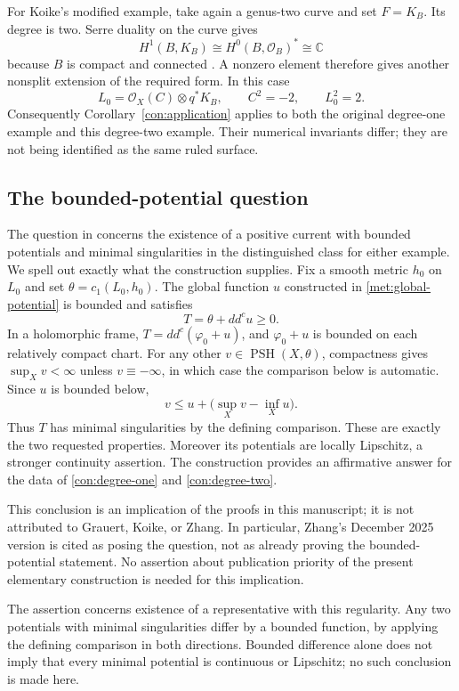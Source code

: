 \documentclass[11pt,a4paper]{article}
\numberwithin{equation}{section}
\theoremstyle{definition}
\theoremstyle{remark}
\newcommand{\C}{\mathbb C}
\newcommand{\OO}{\mathcal O}
\newcommand{\ddc}{dd^{c}}
\newcommand{\cOne}{c_1}
\DeclareMathOperator{\PSH}{PSH}
\begin{document}
For Koike's modified example, take again a genus-two curve and set
$F=K_B$. Its degree is two. Serre duality on the curve gives
\[
 H^1(B,K_B)\cong H^0(B,\OO_B)^*\cong\C
\]
because $B$ is compact and connected
\cite[Chapter III, \S7]{Hartshorne1977}. A nonzero element therefore
gives another nonsplit extension of the required form. In this case
\begin{equation}\label{con:degree-two}
 L_0=\OO_X(C)\otimes q^*K_B,\qquad C^2=-2,\qquad L_0^2=2.
\end{equation}
Consequently Corollary~\ref{con:application} applies to both the original
degree-one example and this degree-two example. Their numerical
invariants differ; they are not being identified as the same ruled
surface.

\subsection{The bounded-potential question}

The question in \cite[\S4]{Zhang2025} concerns the existence of a
positive current with bounded potentials and minimal singularities
in the distinguished class for either example. We spell out exactly
what the construction supplies. Fix a smooth metric $h_0$ on $L_0$
and set $\theta=\cOne(L_0,h_0)$. The global function $u$ constructed
in \eqref{met:global-potential} is bounded and satisfies
\[
                      T=\theta+\ddc u\ge0 .
\]
In a holomorphic frame, $T=\ddc(\varphi_0+u)$, and
$\varphi_0+u$ is bounded on each relatively compact chart.
For any other $v\in\PSH(X,\theta)$, compactness gives
$\sup_Xv<\infty$ unless $v\equiv-\infty$, in which case the
comparison below is automatic. Since $u$ is bounded below,
\[
                v\le u+\bigl(\sup_Xv-\inf_Xu\bigr).
\]
Thus $T$ has minimal singularities by the defining comparison.
These are exactly the two requested properties. Moreover its
potentials are locally Lipschitz, a stronger continuity assertion.
The construction provides an affirmative answer for the data of
\eqref{con:degree-one} and \eqref{con:degree-two}.

This conclusion is an implication of the proofs in this manuscript;
it is not attributed to Grauert, Koike, or Zhang. In particular,
Zhang's December 2025 version is cited as posing the question, not
as already proving the bounded-potential statement. No assertion
about publication priority of the present elementary construction
is needed for this implication.

The assertion concerns existence of a representative with this
regularity. Any two potentials with minimal singularities differ
by a bounded function, by applying the defining comparison in both
directions. Bounded difference alone does not imply that every
minimal potential is continuous or Lipschitz; no such conclusion
is made here.
\end{document}
